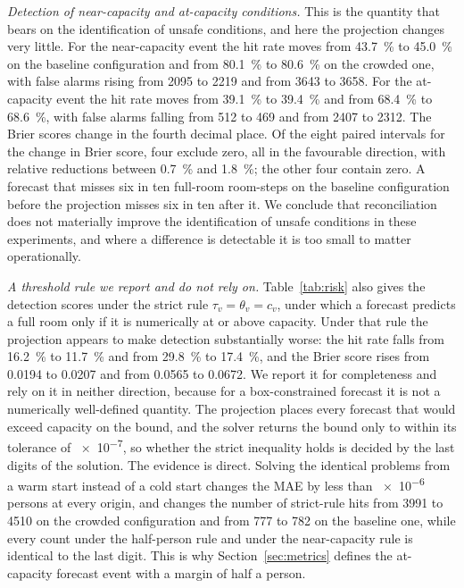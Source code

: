 \documentclass[utf8]{FrontiersinHarvard}
\newif\ifsecondrevisionmarkup
\newcommand{\rev}[1]{\ifsecondrevisionmarkup\textcolor{revisiontwo}{#1}\else#1\fi}
\theoremstyle{plain}
\theoremstyle{definition}
\theoremstyle{remark}
\begin{document}
\rev{\emph{Detection of near-capacity and at-capacity conditions.} This is the quantity that bears on the identification of unsafe conditions, and here the projection changes very little. For the near-capacity event the hit rate moves from \SI{43.7}{\percent} to \SI{45.0}{\percent} on the baseline configuration and from \SI{80.1}{\percent} to \SI{80.6}{\percent} on the crowded one, with false alarms rising from \num{2095} to \num{2219} and from \num{3643} to \num{3658}. For the at-capacity event the hit rate moves from \SI{39.1}{\percent} to \SI{39.4}{\percent} and from \SI{68.4}{\percent} to \SI{68.6}{\percent}, with false alarms falling from \num{512} to \num{469} and from \num{2407} to \num{2312}. The Brier scores change in the fourth decimal place. Of the eight paired intervals for the change in Brier score, four exclude zero, all in the favourable direction, with relative reductions between \SI{0.7}{\percent} and \SI{1.8}{\percent}; the other four contain zero. A forecast that misses six in ten full-room room-steps on the baseline configuration before the projection misses six in ten after it. We conclude that reconciliation does not materially improve the identification of unsafe conditions in these experiments, and where a difference is detectable it is too small to matter operationally.}

\rev{\emph{A threshold rule we report and do not rely on.} Table~\ref{tab:risk} also gives the detection scores under the strict rule $\tau_v = \theta_v = c_v$, under which a forecast predicts a full room only if it is numerically at or above capacity. Under that rule the projection appears to make detection substantially worse: the hit rate falls from \SI{16.2}{\percent} to \SI{11.7}{\percent} and from \SI{29.8}{\percent} to \SI{17.4}{\percent}, and the Brier score rises from \num{0.0194} to \num{0.0207} and from \num{0.0565} to \num{0.0672}. We report it for completeness and rely on it in neither direction, because for a box-constrained forecast it is not a numerically well-defined quantity. The projection places every forecast that would exceed capacity on the bound, and the solver returns the bound only to within its tolerance of \num{e-7}, so whether the strict inequality holds is decided by the last digits of the solution. The evidence is direct. Solving the identical problems from a warm start instead of a cold start changes the MAE by less than \num{e-6} persons at every origin, and changes the number of strict-rule hits from \num{3991} to \num{4510} on the crowded configuration and from \num{777} to \num{782} on the baseline one, while every count under the half-person rule and under the near-capacity rule is identical to the last digit. This is why Section~\ref{sec:metrics} defines the at-capacity forecast event with a margin of half a person.}
\end{document}
